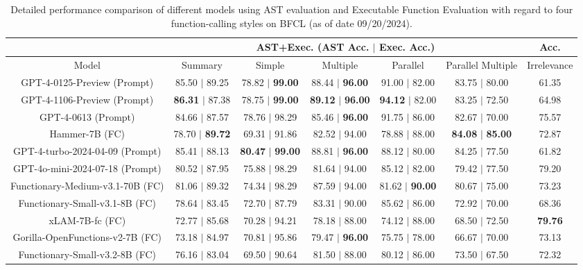 \documentclass{article}
\begin{document}
\begin{table}[ht]
\scriptsize
\centering
\caption{Detailed performance comparison of different models using AST evaluation and Executable Function Evaluation with regard to four function-calling styles on BFCL (as of date 09/20/2024).}
\label{table:bfcl-ast-exec}
\begin{tabular}{c|ccccc|c}
\toprule
& \multicolumn{5}{|c|}{AST+Exec. (AST Acc. $|$ Exec. Acc.)} & Acc. \\
\midrule
Model & Summary & Simple & Multiple & Parallel & Parallel Multiple & Irrelevance \\ 
\midrule
GPT-4-0125-Preview (Prompt) & 85.50 $|$ 89.25 & 78.82 $|$ \textbf{99.00} & 88.44 $|$ \textbf{96.00} & 91.00 $|$ 82.00 & 83.75 $|$ 80.00 & 61.35\\
GPT-4-1106-Preview (Prompt) & \textbf{86.31} $|$ 87.38 & 78.75 $|$ \textbf{99.00} & \textbf{89.12} $|$ \textbf{96.00} & \textbf{94.12} $|$ 82.00 & 83.25 $|$ 72.50 & 64.98\\
GPT-4-0613 (Prompt) & 84.66 $|$ 87.57 & 78.76 $|$ 98.29 & 85.46 $|$ \textbf{96.00} & 91.75 $|$ 86.00 & 82.67 $|$ 70.00 & 75.57\\
\rowcolor[HTML]{EFEFEF} Hammer-7B (FC) & 78.70 $|$ \textbf{89.72} & 69.31 $|$ 91.86  & 82.52 $|$ 94.00 & 78.88 $|$ 88.00 & \textbf{84.08} $|$ \textbf{85.00} & 72.87\\
GPT-4-turbo-2024-04-09 (Prompt) & 85.41 $|$ 88.13 & \textbf{80.47} $|$ \textbf{99.00} & 88.81 $|$ \textbf{96.00} & 88.12 $|$ 80.00 & 84.25 $|$ 77.50 & 61.82\\
GPT-4o-mini-2024-07-18 (Prompt) & 80.52 $|$ 87.95 & 75.88 $|$ 98.29 & 81.64 $|$ 94.00 & 85.12 $|$ 82.00 & 79.42 $|$ 77.50 & 79.20\\
Functionary-Medium-v3.1-70B (FC) & 81.06 $|$ 89.32 & 74.34 $|$ 98.29 & 87.59 $|$ 94.00 & 81.62 $|$ \textbf{90.00} & 80.67 $|$ 75.00 & 73.23\\
Functionary-Small-v3.1-8B (FC) & 78.64 $|$ 83.45 & 72.70 $|$ 87.79 & 83.31 $|$ 90.00 & 85.62 $|$ 86.00 & 72.92 $|$ 70.00 & 68.36\\
xLAM-7B-fc (FC) & 72.77 $|$ 85.68 & 70.28 $|$ 94.21 & 78.18 $|$ 88.00 & 74.12 $|$ 88.00 & 68.50 $|$ 72.50 & \textbf{79.76}\\
Gorilla-OpenFunctions-v2-7B (FC) & 73.18 $|$ 84.97 & 70.81 $|$ 95.86 & 79.47 $|$ \textbf{96.00} & 75.75 $|$ 78.00 & 66.67 $|$ 70.00 & 73.13\\
Functionary-Small-v3.2-8B (FC) & 76.16 $|$ 83.04  & 69.50 $|$ 90.64 & 81.50 $|$ 88.00 & 80.12 $|$ 86.00 & 73.50 $|$ 67.50 & 72.32\\

\end{tabular}
\end{table}
\end{document}
